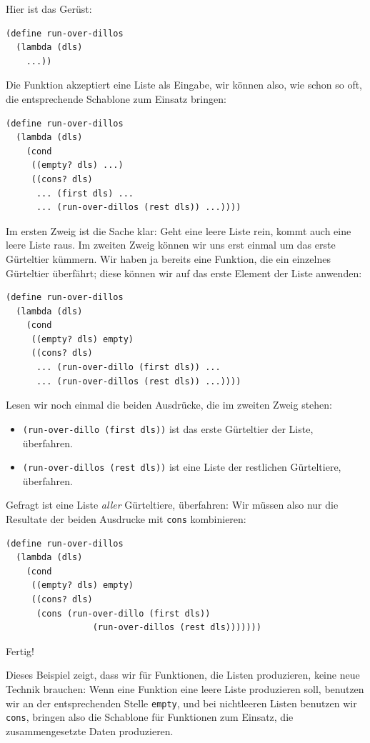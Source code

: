 Hier ist das Gerüst:
%
\begin{verbatim}
(define run-over-dillos
  (lambda (dls)
    ...))
\end{verbatim}
%
Die Funktion akzeptiert eine Liste als Eingabe, wir können also, wie
schon so oft, die entsprechende Schablone zum Einsatz bringen:
%
\begin{verbatim}
(define run-over-dillos
  (lambda (dls)
    (cond
     ((empty? dls) ...)
     ((cons? dls)
      ... (first dls) ...
      ... (run-over-dillos (rest dls)) ...))))
\end{verbatim}
%
Im ersten Zweig ist die Sache klar: Geht eine leere Liste rein, kommt
auch eine leere Liste raus.  Im zweiten Zweig können wir uns erst
einmal um das erste Gürteltier kümmern.  Wir haben ja bereits eine
Funktion, die ein einzelnes Gürteltier überfährt; diese können wir auf
das erste Element der Liste anwenden:
%
\begin{verbatim}
(define run-over-dillos
  (lambda (dls)
    (cond
     ((empty? dls) empty)
     ((cons? dls)
      ... (run-over-dillo (first dls)) ...
      ... (run-over-dillos (rest dls)) ...))))
\end{verbatim}
%
Lesen wir noch einmal die beiden Ausdrücke, die im zweiten Zweig
stehen:
%
\begin{itemize}
\item \texttt{(run-over-dillo (first dls))} ist das erste Gürteltier
  der Liste, überfahren.
\item \texttt{(run-over-dillos (rest dls))} ist eine Liste der
  restlichen Gürteltiere, überfahren.
\end{itemize}
%
Gefragt ist eine Liste \emph{aller} Gürteltiere, überfahren:
Wir müssen also nur die Resultate der beiden Ausdrucke mit
\texttt{cons} kombinieren:
%
\begin{verbatim}
(define run-over-dillos
  (lambda (dls)
    (cond
     ((empty? dls) empty)
     ((cons? dls)
      (cons (run-over-dillo (first dls))
                 (run-over-dillos (rest dls)))))))
\end{verbatim}
%
Fertig!

Dieses Beispiel zeigt, dass wir für Funktionen, die Listen produzieren,
keine neue Technik brauchen: Wenn eine Funktion eine leere Liste
produzieren soll, benutzen wir an der entsprechenden Stelle
\texttt{empty}, und bei nichtleeren Listen benutzen wir
\texttt{cons}, bringen also die Schablone für Funktionen zum
Einsatz, die zusammengesetzte Daten produzieren.

